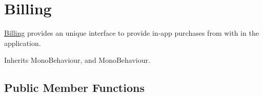 \hypertarget{class_voxel_busters_1_1_native_plugins_1_1_billing}{}\section{Billing}
\label{class_voxel_busters_1_1_native_plugins_1_1_billing}


\hyperlink{class_voxel_busters_1_1_native_plugins_1_1_billing}{Billing} provides an unique interface to provide in-\/app purchases from with in the application.  




Inherits Mono\+Behaviour, and Mono\+Behaviour.

\subsection*{Public Member Functions}
